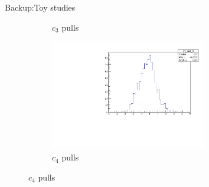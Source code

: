\documentclass{beamer}
\begin{document}
\begin{frame}{Backup:Toy studies}
\begin{figure}
\begin{subfigure}{0.5\textwidth}
      \caption{$c_3$ pulls}
    \end{subfigure}%
    \begin{subfigure}{0.5\textwidth}
      \centering
      \includegraphics[width=0.75\textwidth,trim={0 0 0 0},clip=true]{Plots/c4_ToyFits_pull.pdf}
      \caption{$c_4$ pulls}
    \end{subfigure}
  \end{figure}
\end{frame}
\end{document}
